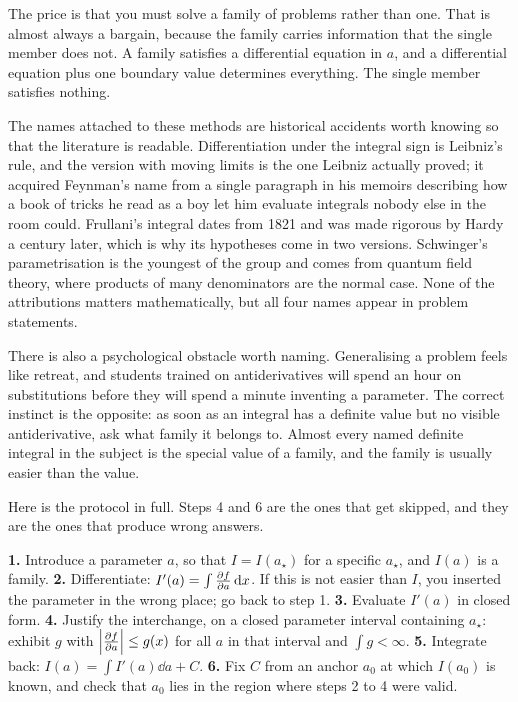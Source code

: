 The price is that you must solve a family of problems rather than one. That is almost always a bargain, because the family carries information that the single member does not. A family satisfies a differential equation in $a$, and a differential equation plus one boundary value determines everything. The single member satisfies nothing.

The names attached to these methods are historical accidents worth knowing so that the literature is readable. Differentiation under the integral sign is Leibniz's rule, and the version with moving limits is the one Leibniz actually proved; it acquired Feynman's name from a single paragraph in his memoirs describing how a book of tricks he read as a boy let him evaluate integrals nobody else in the room could. Frullani's integral dates from 1821 and was made rigorous by Hardy a century later, which is why its hypotheses come in two versions. Schwinger's parametrisation is the youngest of the group and comes from quantum field theory, where products of many denominators are the normal case. None of the attributions matters mathematically, but all four names appear in problem statements.

There is also a psychological obstacle worth naming. Generalising a problem feels like retreat, and students trained on antiderivatives will spend an hour on substitutions before they will spend a minute inventing a parameter. The correct instinct is the opposite: as soon as an integral has a definite value but no visible antiderivative, ask what family it belongs to. Almost every named definite integral in the subject is the special value of a family, and the family is usually easier than the value.

Here is the protocol in full. Steps 4 and 6 are the ones that get skipped, and they are the ones that produce wrong answers.

\begin{keynote}
\textbf{1.} Introduce a parameter $a$, so that $I=I(a_\star)$ for a specific $a_\star$, and $I(a)$ is a family.
\textbf{2.} Differentiate: $I'(a)=\int \frac{\partial f}{\partial a}\,\mathrm{d} x$. If this is not easier than $I$, you inserted the parameter in the wrong place; go back to step 1.
\textbf{3.} Evaluate $I'(a)$ in closed form.
\textbf{4.} Justify the interchange, on a closed parameter interval containing $a_\star$: exhibit $g$ with $\left\lvert \frac{\partial f}{\partial a}\right\rvert\leq g(x)$ for all $a$ in that interval and $\int g<\infty$.
\textbf{5.} Integrate back: $I(a)=\int I'(a)\dd a+C$.
\textbf{6.} Fix $C$ from an anchor $a_0$ at which $I(a_0)$ is known, and check that $a_0$ lies in the region where steps 2 to 4 were valid.
\end{keynote}

